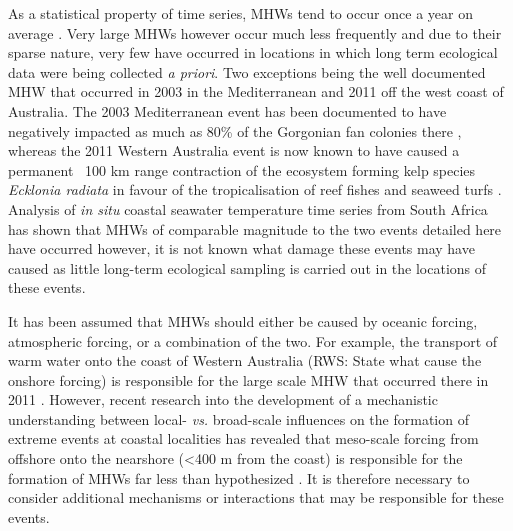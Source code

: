 \documentclass[a4paper,10pt,review]{elsarticle}
\begin{document}
As a statistical property of time series, MHWs tend to occur once a year on average \citep{Schlegel2017}. Very large MHWs however occur much less frequently and due to their sparse nature, very few have occurred in locations in which long term ecological data were being collected \emph{a priori}. Two exceptions being the well documented MHW that occurred in 2003 in the Mediterranean and 2011 off the west coast of Australia. The 2003 Mediterranean event has been documented to have negatively impacted as much as 80\% of the Gorgonian fan colonies there \citep{Garrabou2009}, whereas the 2011 Western Australia event is now known to have caused a permanent ~100 km range contraction of the ecosystem forming kelp species \emph{Ecklonia radiata} in favour of the tropicalisation of reef fishes and seaweed turfs \citep{Wernberg2016}. Analysis of \emph{in situ} coastal seawater temperature time series from South Africa has shown that MHWs of comparable magnitude to the two events detailed here have occurred however, it is not known what damage these events may have caused as little long-term ecological sampling is carried out in the locations of these events.

It has been assumed that MHWs should either be caused by oceanic forcing, atmospheric forcing, or a combination of the two. For example, the transport of warm water onto the coast of Western Australia (RWS: State what cause the onshore forcing) is responsible for the large scale MHW that occurred there in 2011 \citep{Feng2013, Benthuysen2014}. However, recent research into the development of a mechanistic understanding between local- \emph{vs.} broad-scale influences on the formation of extreme events at coastal localities has revealed that meso-scale forcing from offshore onto the nearshore (<400 m from the coast) is responsible for the formation of MHWs far less than hypothesized \citep{Schlegel2017}. It is therefore necessary to consider additional mechanisms or interactions that may be responsible for these events. 
\end{document}
